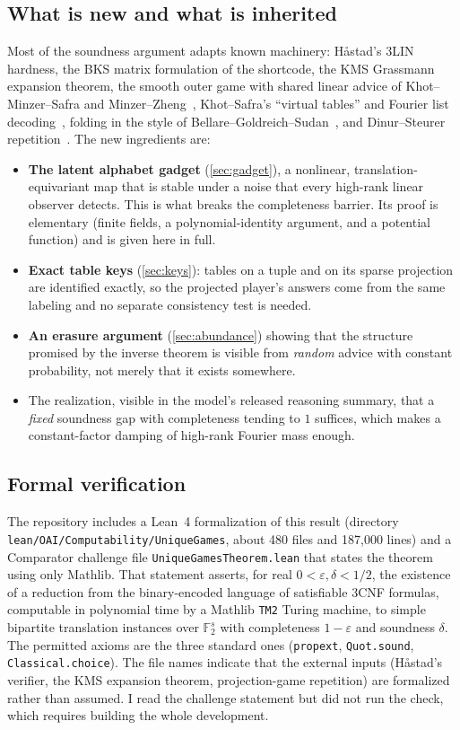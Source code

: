 \documentclass[11pt]{article}
\theoremstyle{definition}
\theoremstyle{remark}
\newcommand{\F}{\mathbb F}
\newcommand{\eps}{\varepsilon}
\begin{document}
\subsection{What is new and what is inherited}

Most of the soundness argument adapts known machinery: H{\aa}stad's 3LIN
hardness, the BKS matrix formulation of the shortcode, the KMS Grassmann
expansion theorem, the smooth outer game with shared linear advice of
Khot--Minzer--Safra and Minzer--Zheng~\cite{KMS17,MZ}, Khot--Safra's
``virtual tables'' and Fourier list decoding~\cite{KS13}, folding in the style of
Bellare--Goldreich--Sudan~\cite{BGS98}, and Dinur--Steurer
repetition~\cite{DS14}. The new ingredients are:

\begin{itemize}
\item \textbf{The latent alphabet gadget} (\cref{sec:gadget}), a nonlinear,
  translation-equivariant map that is stable under a noise that every
  high-rank linear observer detects. This is what breaks the completeness
  barrier. Its proof is elementary (finite fields, a polynomial-identity
  argument, and a potential function) and is given here in full.
\item \textbf{Exact table keys} (\cref{sec:keys}): tables on a tuple and on its
  sparse projection are identified exactly, so the projected player's answers
  come from the same labeling and no separate consistency test is needed.
\item \textbf{An erasure argument} (\cref{sec:abundance}) showing that the
  structure promised by the inverse theorem is visible from \emph{random}
  advice with constant probability, not merely that it exists somewhere.
\item The realization, visible in the model's released reasoning summary, that
  a \emph{fixed} soundness gap with completeness tending to $1$ suffices,
  which makes a constant-factor damping of high-rank Fourier mass enough.
\end{itemize}

\subsection{Formal verification}\label{sec:lean}

The repository includes a Lean~4 formalization of this result (directory
\nolinkurl{lean/OAI/Computability/UniqueGames}, about 480 files and 187{,}000
lines) and a Comparator challenge file \texttt{UniqueGamesTheorem.lean} that
states the theorem using only Mathlib. That statement asserts, for real
$0<\eps,\delta<1/2$, the existence of a reduction from the binary-encoded
language of satisfiable 3CNF formulas, computable in polynomial time by a
Mathlib \texttt{TM2} Turing machine, to simple bipartite translation
instances over $\F_2^s$ with completeness $1-\eps$ and soundness $\delta$.
The permitted axioms are the three standard ones (\texttt{propext},
\texttt{Quot.sound}, \texttt{Classical.choice}). The file names indicate that
the external inputs (H{\aa}stad's verifier, the KMS expansion theorem,
projection-game repetition) are formalized rather than assumed. I read the
challenge statement but did not run the check, which requires building the
whole development.
\end{document}
